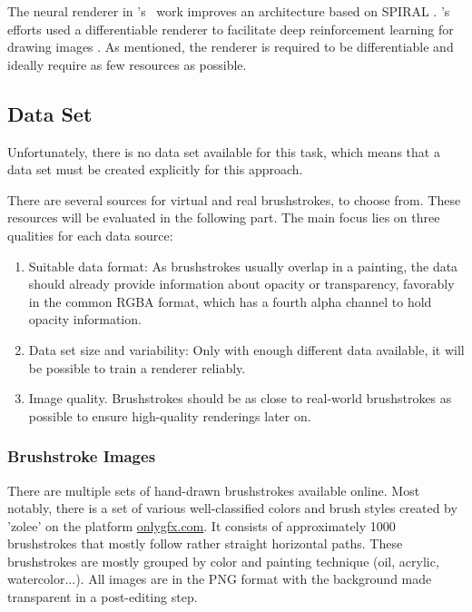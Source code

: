 The neural renderer in \citeauthor*{japanese neural renderer}'s~\cite{japanese neural renderer} work improves an architecture based on SPIRAL \cite{SPIRAL}.
\citeauthor*{Learning2Paint}'s efforts used a differentiable renderer to facilitate deep reinforcement learning for drawing images \cite{Learning2Paint}.
As mentioned, the renderer is required to be differentiable and ideally require as few resources as possible.

\subsection{Data Set}

Unfortunately, there is no data set available for this task, which means that a data set must be created explicitly for this approach.

There are several sources for virtual and real brushstrokes, to choose from.
These resources will be evaluated in the following part.
The main focus lies on three qualities for each data source:
\begin{enumerate}
    \item Suitable data format: As brushstrokes usually overlap in a painting, the data should already provide information about opacity or transparency, favorably in the common RGBA format, which has a fourth alpha channel to hold opacity information.
    \item Data set size and variability: Only with enough different data available, it will be possible to train a renderer reliably.
    \item Image quality. Brushstrokes should be as close to real-world brushstrokes as possible to ensure high-quality renderings later on.
\end{enumerate}

\subsubsection{Brushstroke Images}

There are multiple sets of hand-drawn brushstrokes available online.
Most notably, there is a set of various well-classified colors and brush styles created by 'zolee'  on the platform \url{onlygfx.com}.
It consists of approximately 1000 brushstrokes that mostly follow rather straight horizontal paths.
These brushstrokes are mostly grouped by color and painting technique (oil, acrylic, watercolor...).
All images are in the PNG format with the background made transparent in a post-editing step.

